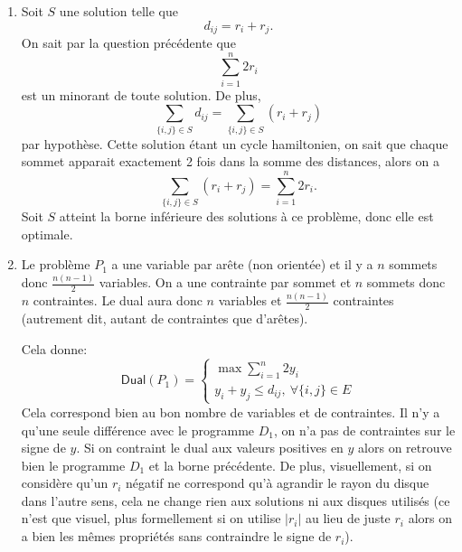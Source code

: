 {\begin{td-sol}[]
\begin{enumerate}
            \item Soit \(S\) une solution telle que
            \begin{equation*}
                d_{ij} = r_i + r_j.
            \end{equation*}
            On sait par la question précédente que 
            \begin{equation*}
                \sum_{i=1}^n 2r_i
            \end{equation*}
            est un minorant de toute solution.
            De plus, 
            \begin{equation*}
                \sum_{\{i, j\}\in S} d_{ij} = \sum_{\{i, j\}\in S} (r_i + r_j)
            \end{equation*}
            par hypothèse.
            Cette solution étant un cycle hamiltonien, on sait que chaque sommet apparait exactement 2 fois dans la somme des distances, alors on a
            \begin{equation*}
                \sum_{\{i, j\}\in S} (r_i + r_j) = \sum_{i=1}^n 2r_i.
            \end{equation*}
            Soit \(S\) atteint la borne inférieure des solutions à ce problème, donc elle est optimale.

            \item Le problème \(P_1\) a une variable par arête (non orientée) et il y a \(n\) sommets donc \(\frac{n(n-1)}2\) variables.
            On a une contrainte par sommet et \(n\) sommets donc \(n\) contraintes.
            Le dual aura donc \(n\) variables et \(\frac{n(n-1)}2\) contraintes (autrement dit, autant de contraintes que d'arêtes).

            Cela donne:
            \begin{equation*}
                \mathsf{Dual}(P_1) = 
                \begin{cases}
                    \max \sum_{i=1}^n 2y_i\\
                    y_i + y_j \leq d_{ij},\ \forall \{i,j\}\in E
                \end{cases}
            \end{equation*}
            Cela correspond bien au bon nombre de variables et de contraintes.
            Il n'y a qu'une seule différence avec le programme \(D_1\), on n'a pas de contraintes sur le signe de \(y\).
            Si on contraint le dual aux valeurs positives en \(y\) alors on retrouve bien le programme \(D_1\) et la borne précédente.
            De plus, visuellement, si on considère qu'un \(r_i\) négatif ne correspond qu'à agrandir le rayon du disque dans l'autre sens, cela ne change rien aux solutions ni aux disques utilisés (ce n'est que visuel, plus formellement si on utilise \(|r_i|\) au lieu de juste \(r_i\) alors on a bien les mêmes propriétés sans contraindre le signe de \(r_i\)).


\end{enumerate}
\end{td-sol}}

